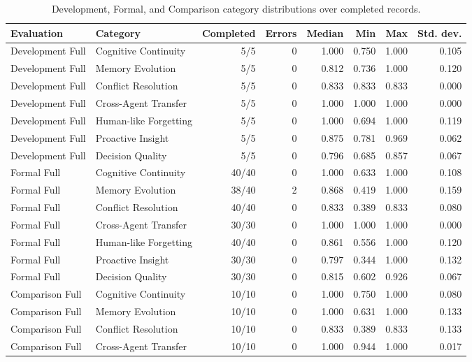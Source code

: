 \begin{table}[t]
\centering\scriptsize
\caption{Development, Formal, and Comparison category distributions over completed records.}
\label{tab:category-details}
\begin{tabular}{llrrrrrr}
\toprule
Evaluation & Category & Completed & Errors & Median & Min & Max & Std. dev. \\
\midrule
Development Full & Cognitive Continuity & 5/5 & 0 & 1.000 & 0.750 & 1.000 & 0.105 \\
Development Full & Memory Evolution & 5/5 & 0 & 0.812 & 0.736 & 1.000 & 0.120 \\
Development Full & Conflict Resolution & 5/5 & 0 & 0.833 & 0.833 & 0.833 & 0.000 \\
Development Full & Cross-Agent Transfer & 5/5 & 0 & 1.000 & 1.000 & 1.000 & 0.000 \\
Development Full & Human-like Forgetting & 5/5 & 0 & 1.000 & 0.694 & 1.000 & 0.119 \\
Development Full & Proactive Insight & 5/5 & 0 & 0.875 & 0.781 & 0.969 & 0.062 \\
Development Full & Decision Quality & 5/5 & 0 & 0.796 & 0.685 & 0.857 & 0.067 \\
Formal Full & Cognitive Continuity & 40/40 & 0 & 1.000 & 0.633 & 1.000 & 0.108 \\
Formal Full & Memory Evolution & 38/40 & 2 & 0.868 & 0.419 & 1.000 & 0.159 \\
Formal Full & Conflict Resolution & 40/40 & 0 & 0.833 & 0.389 & 0.833 & 0.080 \\
Formal Full & Cross-Agent Transfer & 30/30 & 0 & 1.000 & 1.000 & 1.000 & 0.000 \\
Formal Full & Human-like Forgetting & 40/40 & 0 & 0.861 & 0.556 & 1.000 & 0.120 \\
Formal Full & Proactive Insight & 30/30 & 0 & 0.797 & 0.344 & 1.000 & 0.132 \\
Formal Full & Decision Quality & 30/30 & 0 & 0.815 & 0.602 & 0.926 & 0.067 \\
Comparison Full & Cognitive Continuity & 10/10 & 0 & 1.000 & 0.750 & 1.000 & 0.080 \\
Comparison Full & Memory Evolution & 10/10 & 0 & 1.000 & 0.631 & 1.000 & 0.133 \\
Comparison Full & Conflict Resolution & 10/10 & 0 & 0.833 & 0.389 & 0.833 & 0.133 \\
Comparison Full & Cross-Agent Transfer & 10/10 & 0 & 1.000 & 0.944 & 1.000 & 0.017 \\

\end{tabular}
\end{table}
